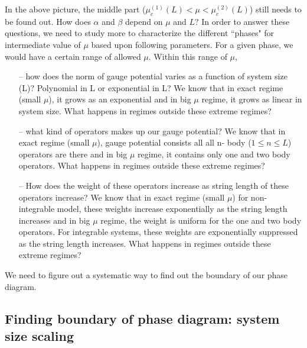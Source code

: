 \documentclass[11pt,a4paper]{article}
\begin{document}
In the above picture, the middle part ($ \mu_c^{(1)}(L) < \mu < \mu_c^{(2)}(L)$) still needs to be found out. How does $\alpha$ and $\beta$ depend on $\mu$ and $L$? In order to answer these questions, we need to study more to characterize the different ``phases" for intermediate value of $\mu$ based upon following parameters. For a given phase, we would have a certain range of allowed $\mu$. Within this range of $\mu$,
\begin{itemize}
\item[--] how does the norm of gauge potential varies as a function of system size (L)? Polynomial in L or exponential in L? We know that in exact regime (small $\mu$), it grows as an exponential and in big $\mu$ regime, it grows as linear in system size. What happens in regimes outside these extreme regimes?
\item[--] what kind of operators makes up our gauge potential? We know that in exact regime (small $\mu$), gauge potential consists all all n- body ($1 \leq n \leq L$) operators are there and in big $\mu$ regime, it contains only one and two body operators. What happens in regimes outside these extreme regimes?
\item[--] How does the weight of these operators increase as string length of these operators increase? We know that in exact regime (small $\mu$) for non-integrable model, these weights increase exponentially as the string length increases  and in big $\mu$ regime, the weight is uniform for the one and two body operators. For integrable systems, these weights are exponentially suppressed as the string length increases.  What happens in regimes outside these extreme regimes?
\end{itemize}


We need to figure out a systematic way to find out the boundary of our phase diagram.




\subsection{Finding boundary of phase diagram: system size scaling }
\end{document}
